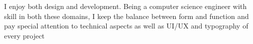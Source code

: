 
\cventry{}
    {\normalfont I enjoy both design and development. Being a computer science engineer with skill in both these domains, I keep the balance between form and function and pay special attention to technical aspects as well as UI/UX and typography of every project}
    {}
    {}
    {}
    {}
\vspace*{0.2\baselineskip}